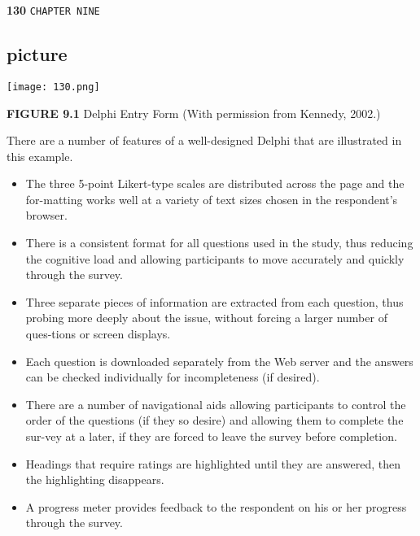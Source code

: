 \documentclass[12pt]{article}
\begin{document}
\begin{flushleft}
\textbf{130}\hspace*{1cm} \texttt{CHAPTER NINE}
\end{flushleft}

\vspace*{0.3cm}
\begin{center}
\section{picture}
\texttt{[image: 130.png]}

\textbf{FIGURE 9.1} \hspace*{0.1cm} Delphi Entry Form (With permission from Kennedy, 2002.)\\
\end{center}

\vspace*{0.5cm}
There are a number of features of a well-designed Delphi that are illustrated in this example.\\

\vspace*{0.2cm}
\begin{itemize}
  \item The three 5-point Likert-type scales are distributed across the page and the for-matting works well at a variety of text sizes chosen in the respondent's browser.\\
  \item There is a consistent format for all questions used in the study, thus reducing the cognitive load and allowing participants to move accurately and quickly through the survey.\\
  \item Three separate pieces of information are extracted from each question, thus probing more deeply about the issue, without forcing a larger number of ques-tions or screen displays.\\
  \item Each question is downloaded separately from the Web server and the answers can be checked individually for incompleteness (if desired). \\
\end{itemize}

\begin{itemize}
  \item There are a number of navigational aids allowing participants to control the order of the questions (if they so desire) and allowing them to complete the sur-vey at a later, if they are forced to leave the survey before completion.\\
  \item Headings that require ratings are highlighted until they are answered, then the highlighting disappears.\\
  \item A progress meter provides feedback to the respondent on his or her progress through the survey.\\
\end{itemize}
\end{document}
